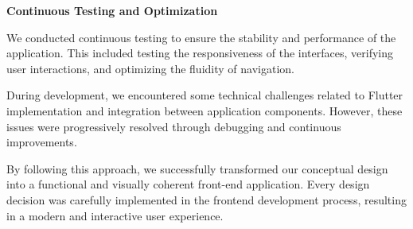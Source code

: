 \documentclass[12pt]{article}
\begin{document}
\textbf{ Continuous Testing and Optimization}

We conducted continuous testing to ensure the stability and performance of the application. This included testing the responsiveness of the interfaces, verifying user interactions, and optimizing the fluidity of navigation.

During development, we encountered some technical challenges related to Flutter implementation and integration between application components. However, these issues were progressively resolved through debugging and continuous improvements.

\vspace{0.5cm}

By following this approach, we successfully transformed our conceptual design into a functional and visually coherent front-end application. Every design decision was carefully implemented in the frontend development process, resulting in a modern and interactive user experience.
\end{document}
